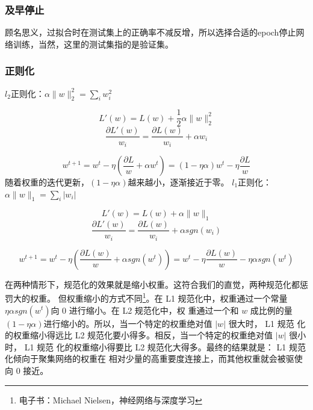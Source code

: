 \subsubsection{及早停止}
顾名思义，过拟合时在测试集上的正确率不减反增，所以选择合适的epoch停止网络训练，当然，这里的测试集指的是验证集。
\subsubsection{正则化}
$l_2$正则化：$\alpha \|w\|^2_2=\sum_i w_i^2$

\[
L'(w)=L(w) + \frac{1}{2}\alpha \|w\|^2_2  
\]
\[
\frac{\partial L'(w)}{w_i}=\frac{\partial L(w)}{w_i} + \alpha w_i
\]

\[
w^{t+1} = w^{t} - \eta (\frac{\partial L}{w} + \alpha w^t)=(1-\eta \alpha)w^t - \eta \frac{\partial L}{w}
\]
随着权重的迭代更新，$(1-\eta \alpha)$越来越小，逐渐接近于零。
$l_1$正则化：$\alpha \|w\|_1 = \sum_i |w_i|$

\[
L'(w)=L(w) + \alpha \|w\|_1 
\]
\[
\frac{\partial L'(w)}{w_i}=\frac{\partial L(w)}{w_i} + \alpha sgn(w_i)
\]

\[
w^{t+1} = w^{t} - \eta (\frac{\partial L(w)}{w} + \alpha sgn(w^t))=w^t-\eta \frac{\partial L(w)}{w} -\eta \alpha sgn(w^t)
\]

在两种情形下，规范化的效果就是缩小权重。这符合我们的直觉，两种规范化都惩罚大的权重。
但权重缩小的方式不同\footnote{电子书：Michael Nielsen，神经网络与深度学习}。在 L1 规范化中，权重通过一个常量$\eta \alpha sgn(w^t)$向 0 进行缩小。在 L2 规范化中，权
重通过一个和 $w$ 成比例的量$(1-\eta \alpha)$进行缩小的。所以，当一个特定的权重绝对值 $|w|$ 很大时， L1 规范
化的权重缩小得远比 L2 规范化要小得多。相反，当一个特定的权重绝对值 $|w|$ 很小时， L1 规范
化的权重缩小得要比 L2 规范化大得多。最终的结果就是： L1 规范化倾向于聚集网络的权重在
相对少量的高重要度连接上，而其他权重就会被驱使向 0 接近。

